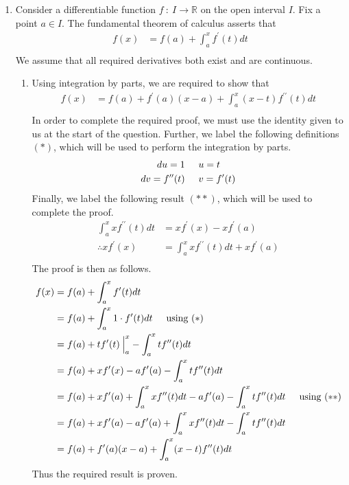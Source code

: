\documentclass[a4paper]{article}
\begin{document}
\begin{enumerate}[label=\textbf{\arabic*.}]
	\item Consider a differentiable function $\displaystyle{f\: : \: I \rightarrow \mathbb{R}}$ on the open interval $\displaystyle{I}$. Fix a point $\displaystyle{a \in I}$. The fundamental theorem of calculus asserts that
	\begin{align*}
	f(x) & = f(a) + \int^{x}_{a}f^{\prime}(t)dt\\
	\end{align*}
	We assume that all required derivatives both exist and are continuous.

	\begin{enumerate}
		\item Using integration by parts, we are required to show that 
		\begin{align*}
		f(x) & = f(a) + f^{\prime}(a)(x-a) + \int^{x}_{a}(x-t)f^{\prime \prime}(t)dt\\
		\end{align*}
		In order to complete the required proof, we must use the identity given to us at the start of the question. Further, we label the following definitions $\displaystyle{(*)}$, which will be used to perform the integration by parts.
		\begin{align*}
		du = 1 &\hspace{5mm} u = t\\
		dv = f^{\prime \prime}(t) &\hspace{5mm} v = f^{\prime}(t)\\
		\end{align*}
		Finally, we label the following result $\displaystyle{(**)}$, which will be used to complete the proof.
		\begin{align*}
		\int^{x}_{a}xf^{\prime \prime}(t)dt & = xf^{\prime}(x) - xf^{\prime}(a)\\
		\therefore xf^{\prime}(x) & = \int^{x}_{a}xf^{\prime \prime}(t)dt + xf^{\prime}(a)\\
		\end{align*}
		The proof is then as follows.
		\begin{align*}
		f(x) & = f(a) + \int^{x}_{a}f^{\prime}(t)dt\\
		& = f(a) + \int^{x}_{a}1\cdot f^{\prime}(t)dt \hspace{5mm} \text{using $(*)$}\\
		& = f(a) + tf^{\prime}(t)\:\Big|^{x}_{a} - \int^{x}_{a}tf^{\prime \prime}(t)dt\\
		& = f(a) + xf^{\prime}(x) - af^{\prime}(a) - \int^{x}_{a}tf^{\prime \prime}(t)dt\\
		& = f(a) + xf^{\prime}(a) + \int^{x}_{a}xf^{\prime \prime}(t)dt - af^{\prime}(a) - \int^{x}_{a}tf^{\prime \prime}(t)dt \hspace{5mm} \text{using $(**)$}\\
		& = f(a) + xf^{\prime}(a) - af^{\prime}(a) + \int^{x}_{a}xf^{\prime \prime}(t)dt - \int^{x}_{a}tf^{\prime \prime}(t)dt\\
		& = f(a) + f^{\prime}(a)(x-a) + \int^{x}_{a}(x-t)f^{\prime \prime}(t)dt\\
		\end{align*}
		Thus the required result is proven.


\end{enumerate}
\end{enumerate}
\end{document}
